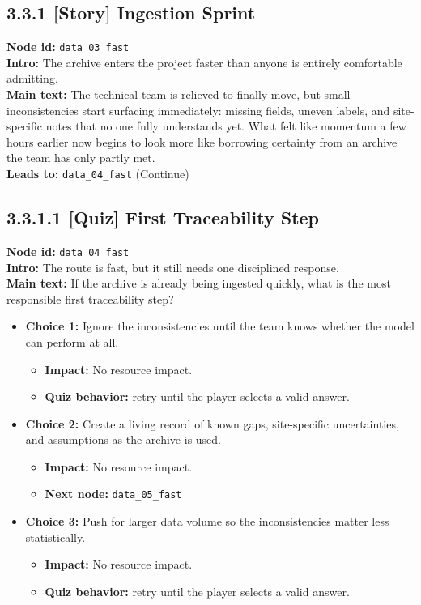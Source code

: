 \documentclass[11pt]{article}
\begin{document}
\subsection*{3.3.1 [Story] Ingestion Sprint}
\textbf{Node id:} \texttt{data\_03\_fast}\\
\textbf{Intro:} The archive enters the project faster than anyone is entirely comfortable admitting.\\
\textbf{Main text:} The technical team is relieved to finally move, but small inconsistencies start surfacing immediately: missing fields, uneven labels, and site-specific notes that no one fully understands yet. What felt like momentum a few hours earlier now begins to look more like borrowing certainty from an archive the team has only partly met.\\
\textbf{Leads to:} \texttt{data\_04\_fast} (Continue)\\
\subsection*{3.3.1.1 [Quiz] First Traceability Step}
\textbf{Node id:} \texttt{data\_04\_fast}\\
\textbf{Intro:} The route is fast, but it still needs one disciplined response.\\
\textbf{Main text:} If the archive is already being ingested quickly, what is the most responsible first traceability step?\\
\begin{itemize}
\item \textbf{Choice 1:} Ignore the inconsistencies until the team knows whether the model can perform at all.
\begin{itemize}
\item \textbf{Impact:} No resource impact.
\item \textbf{Quiz behavior:} retry until the player selects a valid answer.
\end{itemize}
\item \textbf{Choice 2:} Create a living record of known gaps, site-specific uncertainties, and assumptions as the archive is used.
\begin{itemize}
\item \textbf{Impact:} No resource impact.
\item \textbf{Next node:} \texttt{data\_05\_fast}
\end{itemize}
\item \textbf{Choice 3:} Push for larger data volume so the inconsistencies matter less statistically.
\begin{itemize}
\item \textbf{Impact:} No resource impact.
\item \textbf{Quiz behavior:} retry until the player selects a valid answer.
\end{itemize}
\end{itemize}
\end{document}

